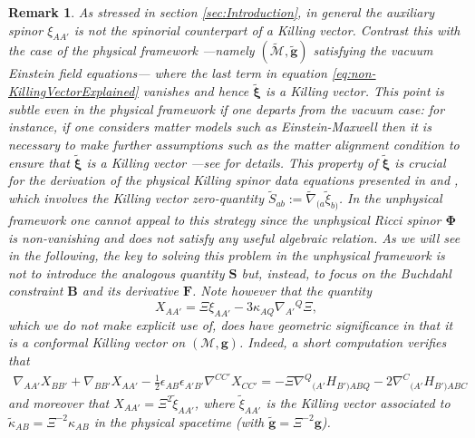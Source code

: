 \documentclass[10pt,a4paper]{article}
\theoremstyle{plain}
\newtheorem{remark}{Remark}
\def\bmg{{\bm g}}
\def\bmB{{\bm B}}
\def\bmF{{\bm F}}
\def\bmS{{\bm S}}
\begin{document}
\begin{remark}
\label{GeometricSignificance}
  \emph{ As stressed in section \ref{sec:Introduction}, in general
  the auxiliary spinor $\xi_{AA'}$ is not the spinorial counterpart of
  a Killing vector. Contrast this with the case of the physical
  framework ---namely $(\tilde{\mathcal{M}},\tilde{\bmg})$ satisfying
  the vacuum Einstein field equations--- where the last term in
  equation \eqref{eq:non-KillingVectorExplained} vanishes and hence
  $\tilde{\bm\xi}$ is a Killing vector. This point is subtle even
  in the physical framework if one departs from the vacuum case: for instance, if one considers matter models such as
  Einstein-Maxwell then it is necessary to make further assumptions
  such as the \emph{matter alignment condition} to ensure that $\tilde{\bm\xi}$ is a
  Killing vector ---see \cite{ValCol16} for details. This property of
  $\tilde{\bm\xi}$ is crucial for the derivation of the physical
  Killing spinor data equations presented in \cite{GarVal08c} and
  \cite{ValCol16}, which involves the Killing vector zero-quantity $\tilde{S}_{ab}:=
  \tilde{\nabla}_{(a}\tilde{\xi}_{b)}$. 
  In the unphysical
  framework one cannot appeal to this strategy since the unphysical
  Ricci spinor $\bm\Phi$ is non-vanishing and does not satisfy any
  useful algebraic relation.
  As we will see in
  the following, the key to solving this problem in the unphysical
  framework is not to introduce the analogous quantity $\bmS$ 
  but, instead, to
  focus on the Buchdahl constraint $\bmB$ and its derivative $\bmF$. Note however that the quantity 
  \begin{equation}\label{eq:conformalKillingVector}
X_{AA'}=\Xi \xi_{AA'} - 3 \kappa_{AQ}\nabla_{A'}{}^{Q}\Xi,
\end{equation}
which we do not make explicit use of, does have geometric significance in that it is a conformal Killing vector on $(\mathcal{M},\bmg)$. Indeed, a short computation verifies that
\begin{multline}\label{conformalKillingvector}
  \nabla_{AA'}X_{BB'}+\nabla_{BB'}X_{AA'}-\tfrac{1}{2}\epsilon_{AB}\epsilon_{A'B'}\nabla^{CC'}X_{CC'}
  =-\Xi \nabla^Q{}_{(A'}H_{B')ABQ} - 2\nabla^C{}_{(A'}H_{B')ABC}
\end{multline}
and moreover that $X_{AA'}=\Xi^2 \tilde{\xi}_{AA'}$, where $\tilde{\xi}_{AA'}$ is the Killing vector associated to $\tilde{\kappa}_{AB}=\Xi^{-2}\kappa_{AB}$ in the physical spacetime (with $\tilde{\bmg}=\Xi^{-2}\bmg$). 
  }
\end{remark}
\end{document}
